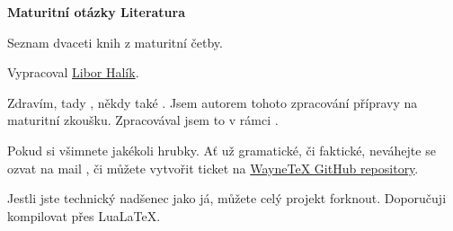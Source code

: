 \documentclass[literature.tex]{subfiles}
\begin{document}
\vspace*{\fill}
\begin{center}
\begin{minipage}[c]{0.70\textwidth}
{\HUGE\color{WPP}\textbf{Maturitní otázky \colorbox{WPP}{\color{DP}Literatura}}}\\
\vspace{0em}%
{\color{WPP}}%
\vspace{0em}\par
\begin{center}
{\large Seznam dvaceti knih z maturitní četby.}\par
{\large Vypracoval \href{https://github.com/ScamanderWayne}{\color{WPP}Libor Halík}}.
\end{center}
\end{minipage}
\end{center}
\vspace*{\fill}
\vspace*{\fill}
\thispagestyle{empty}
\newpage
\vspace*{\fill}    %

\hfill\begin{minipage}{0.6\textwidth}
\raggedleft               %
\parindent=0pt            %
Zdravím, tady , někdy také .
Jsem autorem tohoto zpracování přípravy na maturitní zkoušku.
Zpracovával jsem to v rámci .

\bigskip
Pokud si všimnete jakékoli hrubky.
Ať už gramatické, či faktické, neváhejte se ozvat na mail ,
či můžete vytvořit ticket na \href{https://github.com/ScamanderWayne/WayneTeX/issues/new/choose}{\color{WPP}WayneTeX GitHub repository}.

\bigskip
Jestli jste technický nadšenec jako já, můžete celý projekt forknout.
Doporučuji kompilovat přes Lua\LaTeX .
\end{minipage}
\thispagestyle{empty}
\wpage
\renewcommand\contentsname{}
\hypertarget{contents}{}
\tableofcontents
\thispagestyle{empty}
\wpage
\end{document}
